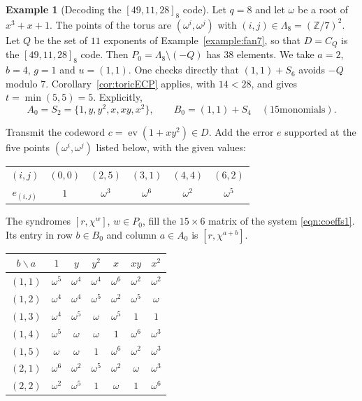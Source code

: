 \documentclass[12pt,letterpaper]{article}
\numberwithin{equation}{section}
\theoremstyle{definition}
\newtheorem{example}[theorem]{Example}
\theoremstyle{remark}
\DeclareMathOperator{\ev}{ev}
\newcommand{\Z}{\mathbb{Z}}
\begin{document}
\begin{example}[{Decoding the $[49,11,28]_8$ code}]\label{ex:decode}
Let $q=8$ and let $\omega$ be a root of $x^3+x+1$. The points of the torus are
$(\omega^i,\omega^j)$ with $(i,j)\in\Lambda_8=(\Z/7)^2$. Let $Q$ be the set of
$11$ exponents of Example~\ref{example:fan7}, so that $D=C_Q$ is the
$[49,11,28]_8$ code. Then $P_0=\Lambda_8\setminus(-Q)$ has $38$ elements. We
take $a=2$, $b=4$, $g=1$ and $u=(1,1)$. One checks directly that $(1,1)+S_6$
avoids $-Q$ modulo $7$. Corollary~\ref{cor:toricECP} applies, with $14<28$,
and gives $t=\min(5,5)=5$. Explicitly,
\[
A_0=S_2=\{1,y,y^2,x,xy,x^2\},\qquad B_0=(1,1)+S_4\quad(15\text{
monomials}).
\]

Transmit the codeword $c=\ev(1+xy^2)\in D$. Add the error $e$ supported at the
five points $(\omega^i,\omega^j)$ listed below, with the given values:
\begin{center}
\begin{tabular}{@{}cccccc@{}}
\toprule
$(i,j)$ & $(0,0)$ & $(2,5)$ & $(3,1)$ & $(4,4)$ & $(6,2)$\\
$e_{(i,j)}$ & $1$ & $\omega^3$ & $\omega^6$ & $\omega^2$ & $\omega^5$\\
\bottomrule
\end{tabular}
\end{center}
The syndromes $[r,\chi^w]$, $w\in P_0$, fill the $15\times6$ matrix of the
system \eqref{eqn:coeffs1}. Its entry in row $b\in B_0$ and column $a\in A_0$
is $[r,\chi^{a+b}]$.
\begin{center}
\small
\begin{tabular}{@{}c|cccccc@{}}
$b\backslash a$ & $1$ & $y$ & $y^2$ & $x$ & $xy$ & $x^2$\\ \hline
$(1,1)$ & $\omega^{5}$ & $\omega^{4}$ & $\omega^{4}$ & $\omega^{6}$ & $\omega^{2}$ & $\omega^{2}$\\
$(1,2)$ & $\omega^{4}$ & $\omega^{4}$ & $\omega^{5}$ & $\omega^{2}$ & $\omega^{5}$ & $\omega$\\
$(1,3)$ & $\omega^{4}$ & $\omega^{5}$ & $\omega$ & $\omega^{5}$ & $1$ & $1$\\
$(1,4)$ & $\omega^{5}$ & $\omega$ & $\omega$ & $1$ & $\omega^{6}$ & $\omega^{3}$\\
$(1,5)$ & $\omega$ & $\omega$ & $1$ & $\omega^{6}$ & $\omega^{2}$ & $\omega^{3}$\\
$(2,1)$ & $\omega^{6}$ & $\omega^{2}$ & $\omega^{5}$ & $\omega^{2}$ & $\omega$ & $\omega^{3}$\\
$(2,2)$ & $\omega^{2}$ & $\omega^{5}$ & $1$ & $\omega$ & $1$ & $\omega^{6}$\\

\end{tabular}
\end{center}
\end{example}
\end{document}
